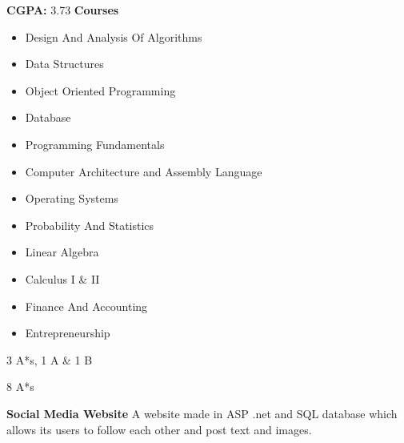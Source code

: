 \documentclass[10pt,a4paper]{altacv}
\begin{document}
\tagline{}

%

\begin{fullwidth}
\makecvheader
\end{fullwidth}

\medskip
\medskip
%


\textbf{CGPA:} 3.73 \newline
\textbf{Courses} 
\begin{itemize}
    \item Design And Analysis Of Algorithms
    \item Data Structures
    \item Object Oriented Programming 
    \item Database
    \item Programming Fundamentals
    \item Computer Architecture and Assembly Language
    \item Operating Systems
    \item Probability And Statistics
    \item Linear Algebra
    \item Calculus I \& II
    \item Finance And Accounting
    \item Entrepreneurship
\end{itemize}
\divider\smallskip

\textbullet{} \small{3 A*s, 1 A \& 1 B}

\divider\smallskip

\textbullet{} \small{8 A*s}
\medskip


\textbf{\large{Social Media Website}}
\newline
A website made in ASP .net and SQL database which allows its users to follow each other and post text and images.
\newline
\end{document}
